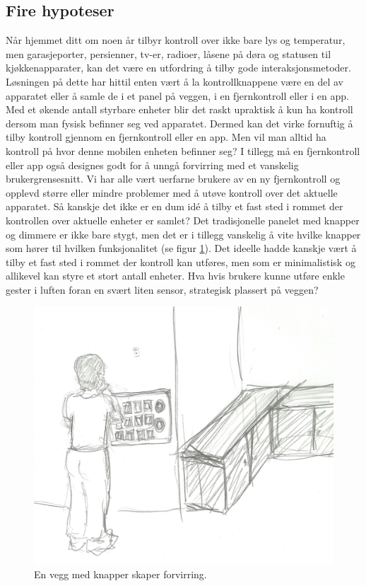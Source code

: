 \subsection{Fire hypoteser}
Når hjemmet ditt om noen år tilbyr kontroll over ikke bare lys og temperatur, men garasjeporter, persienner, tv-er, radioer, låsene på døra og statusen til kjøkkenapparater, kan det være en utfordring å tilby gode interaksjonsmetoder. Løsningen på dette har hittil enten vært å la kontrollknappene være en del av apparatet eller å samle de i et panel på veggen, i en fjernkontroll eller i en app. Med et økende antall styrbare enheter blir det raskt upraktisk å kun ha kontroll dersom man fysisk befinner seg ved apparatet. Dermed kan det virke fornuftig å tilby kontroll gjennom en fjernkontroll eller en app. Men vil man alltid ha kontroll på hvor denne mobilen enheten befinner seg? I tillegg må en fjernkontroll eller app også designes godt for å unngå forvirring med et vanskelig brukergrensesnitt. Vi har alle vært uerfarne brukere av en ny fjernkontroll og opplevd større eller mindre problemer med å utøve kontroll over det aktuelle apparatet. Så kanskje det ikke er en dum idé å tilby et fast sted i rommet der kontrollen over aktuelle enheter er samlet? Det tradisjonelle panelet med knapper og dimmere er ikke bare stygt, men det er i tillegg vanskelig å vite hvilke knapper som hører til hvilken funksjonalitet (se figur \ref{fig:panel}). Det ideelle hadde kanskje vært å tilby et fast sted i rommet der kontroll kan utføres, men som er minimalistisk og allikevel kan styre et stort antall enheter. Hva hvis brukere kunne utføre enkle gester i luften foran en svært liten sensor, strategisk plassert på veggen?
\begin{figure}
\centering
\includegraphics[scale=0.1]{fig/buttons}
\caption{En vegg med knapper skaper forvirring.}
\label{fig:panel}
\end{figure}\newline\newline
